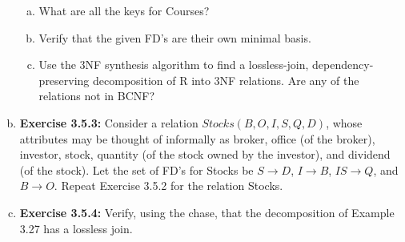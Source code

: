 \documentclass[12pt]{article}
\begin{document}
\begin{enumerate}[a)]
    \begin{enumerate}[a)]
        \item What are all the keys for Courses?
        \item Verify that the given FD's are their own minimal basis.
        \item Use the 3NF synthesis algorithm to find a lossless-join, dependency-preserving decomposition of R into 3NF relations. Are any of the relations not in BCNF?
    \end{enumerate}

    \item \textbf{Exercise 3.5.3:} Consider a relation $Stocks(B, O, I, S, Q, D)$, whose attributes
    may be thought of informally as broker, office (of the broker), investor, stock,
    quantity (of the stock owned by the investor), and dividend (of the stock). Let
    the set of FD's for Stocks be $S \to D$, $I \to B$, $IS \to Q$, and $B \to O$. Repeat
    Exercise 3.5.2 for the relation Stocks.

    \item \textbf{Exercise 3.5.4:} Verify, using the chase, that the decomposition of Example
    3.27 has a lossless join.

\end{enumerate}
\end{document}
